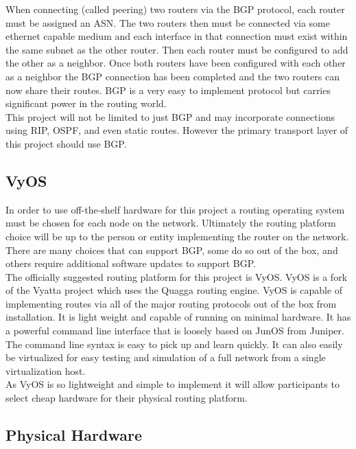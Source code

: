 \documentclass[12pt]{article}
\begin{document}
When connecting (called peering) two routers via the BGP protocol, each router must be assigned an ASN. The two routers then must be connected via 
some ethernet capable medium and each interface in that connection must exist within the same subnet as the other router. Then each router must
be configured to add the other as a neighbor. Once both routers have been configured with each other as a neighbor the BGP connection has been
completed and the two routers can now share their routes. BGP is a very easy to implement protocol but carries significant power in the routing
world.
\\

This project will not be limited to just BGP and may incorporate connections using RIP, OSPF, and even static routes. However the primary transport
layer of this project should use BGP.


\subsection{VyOS}

In order to use off-the-shelf hardware for this project a routing operating system must be chosen for each node on the network. Ultimately the routing
platform choice will be up to the person or entity implementing the router on the network. There are many choices that can support BGP, some do so
out of the box, and others require additional software updates to support BGP.
\\

The officially suggested routing platform for this project is VyOS. VyOS is a fork of the Vyatta project which uses the Quagga routing engine. VyOS
is capable of implementing routes via all of the major routing protocols out of the box from installation. It is light weight and capable of running
on minimal hardware. It has a powerful command line interface that is loosely based on JunOS from Juniper. The command line syntax is easy to pick up
and learn quickly. It can also easily be virtualized for easy testing and simulation of a full network from a single virtualization host. 
\\

As VyOS is so lightweight and simple to implement it will allow participants to select cheap hardware for their physical routing platform. 


\subsection{Physical Hardware}
\end{document}
